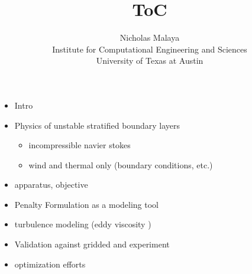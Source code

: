 \documentclass{article}
\title{\bf{ToC}}
\author{Nicholas Malaya \\ Institute for Computational Engineering and Sciences \\ University of Texas at Austin} \date{}
\begin{document}
\maketitle

\newpage

\begin{itemize}
  \item Intro
  \item Physics of unstable stratified boundary layers
\begin{itemize}
	\item incompressible navier stokes
        \item wind and thermal only (boundary conditions, etc.)
\end{itemize}
  \item apparatus, objective
  \item Penalty Formulation as a modeling tool
  \item turbulence modeling (eddy viscosity )
  \item Validation against gridded and experiment
  \item optimization efforts
\end{itemize}
\end{document}
